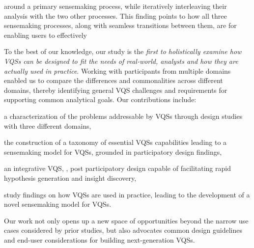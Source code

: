  \par {} around a primary sensemaking process, while iteratively interleaving their analysis with the two other processes. This finding points to how all three sensemaking processes, along with seamless transitions between them, are  for enabling users to effectively %
 \par To the best of our knowledge, our study is the \emph{first to holistically examine how VQSs can be designed to fit the needs of real-world,  analysts and how they are actually used in practice}. Working with participants from multiple domains enabled us to compare the differences and commonalities across different domains, thereby identifying general VQS challenges and requirements for supporting common analytical goals. Our contributions include:
 \begin{denselist}
 \item a characterization of the problems addressable by VQSs through design studies with three different domains,
 \item the construction of a taxonomy of essential VQSs capabilities leading to a sensemaking model for VQSs, grounded in participatory design findings, %
 \item an integrative VQS, \zvpp, post participatory design capable of facilitating rapid hypothesis generation and insight discovery,
 \item study findings on how VQSs are used in practice, leading to the development of a novel sensemaking model for VQSs. %
 \end{denselist}
 Our work not only opens up a new space of opportunities beyond the narrow use cases considered by prior studies, but also advocates common design guidelines and end-user considerations for building next-generation VQSs.